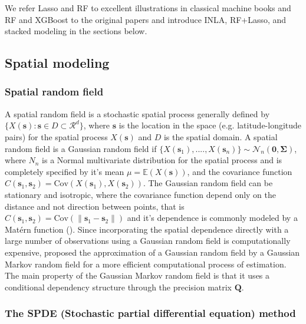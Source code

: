 \documentclass{article}
\begin{document}
We refer  Lasso and RF to excellent illustrations in classical machine books \citep{hastie2009elements,James2013introduction} and RF and XGBoost to the original papers \citep{breiman2001random,chen2016xgboost} and introduce INLA, RF+Lasso, and stacked modeling in the sections below.

\subsection{Spatial modeling}
\subsubsection{Spatial random field}
A spatial random field is a stochastic spatial process generally defined by $\{X(\boldsymbol{s}): \boldsymbol{s} \in D \subset \mathcal{R}^{d}\}$, where $\boldsymbol{s}$ is the location in the space (e.g. latitude-longitude pairs) for the spatial process $X(\boldsymbol{s})$ and $D$ is the spatial domain. A spatial random field is a Gaussian random field if $\{X(\boldsymbol{s}_{1}),...., X(\boldsymbol{s}_{n})\} \sim \mathcal{N}_{n}(\boldsymbol{0}, \boldsymbol{\Sigma})$, where $N_{n}$ is a Normal multivariate distribution for the spatial process and is completely specified by it's mean $\mu = \mathbb{E}(X(\boldsymbol{s}))$, and the covariance function $C(\boldsymbol{s}_{1}, \boldsymbol{s}_{2}) = \text{Cov}(X(\boldsymbol{s}_{1}), X(\boldsymbol{s}_{2}))$. The Gaussian random field can be stationary and isotropic, where the covariance function depend only on the distance and not direction between points, that is $C(\boldsymbol{s}_{1}, \boldsymbol{s}_{2}) = \text{Cov}(\|\boldsymbol{s}_{1} - \boldsymbol{s}_{2}\|)$ and it's dependence is commonly modeled by a Matérn function (\cite{stein2012interpolation}\cite{yuan2011models}). Since incorporating the spatial dependence directly with a large number of observations using a Gaussian random field is computationally expensive, \cite{rue2005gaussian} proposed the approximation of a Gaussian random field by a Gaussian Markov random field for a more efficient computational process of estimation. The main property of the Gaussian Markov random field is that it uses a conditional dependency structure through the precision matrix $\boldsymbol{Q}$.


\subsubsection{The SPDE (Stochastic partial differential equation) method}
\end{document}
